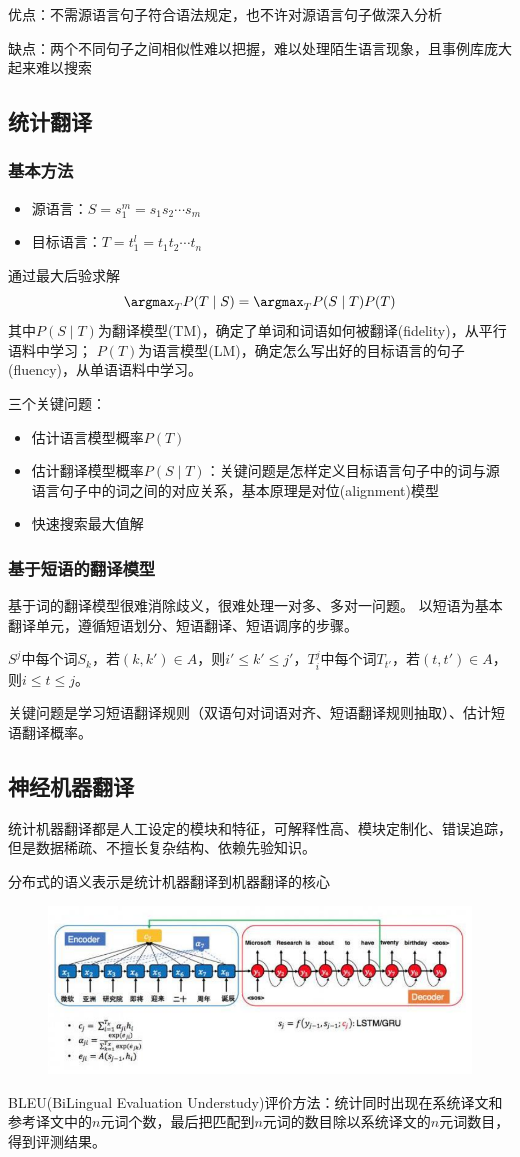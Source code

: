 优点：不需源语言句子符合语法规定，也不许对源语言句子做深入分析
\par 缺点：两个不同句子之间相似性难以把握，难以处理陌生语言现象，且事例库庞大起来难以搜索

\subsection{统计翻译}
\subsubsection{基本方法}
\begin{itemize}
	\item 源语言：$S=s_1^m=s_1s_2\cdots s_m$
	\item 目标语言：$T=t_1^l=t_1t_2\cdots t_n$
\end{itemize}
通过最大后验求解
\[\argmax_TP(T\mid S)=\argmax_T P(S\mid T)P(T)\]
其中$P(S\mid T)$为翻译模型(TM)，确定了单词和词语如何被翻译(fidelity)，从平行语料中学习；
$P(T)$为语言模型(LM)，确定怎么写出好的目标语言的句子(fluency)，从单语语料中学习。

三个关键问题：
\begin{itemize}
	\item 估计语言模型概率$P(T)$
	\item 估计翻译模型概率$P(S\mid T)$：关键问题是怎样定义目标语言句子中的词与源语言句子中的词之间的对应关系，基本原理是对位(alignment)模型
	\item 快速搜索最大值解
\end{itemize}

\subsubsection{基于短语的翻译模型}
基于词的翻译模型很难消除歧义，很难处理一对多、多对一问题。
以短语为基本翻译单元，遵循短语划分、短语翻译、短语调序的步骤。
\begin{definition}[对齐一致性]
$S^j$中每个词$S_k$，若$(k,k')\in A$，则$i'\leq k'\leq j'$，$T_i^j$中每个词$T_{t'}$，若$(t,t')\in A$，则$i\leq t\leq j$。
\end{definition}

关键问题是学习短语翻译规则（双语句对词语对齐、短语翻译规则抽取）、估计短语翻译概率。

\subsection{神经机器翻译}
统计机器翻译都是人工设定的模块和特征，可解释性高、模块定制化、错误追踪，但是数据稀疏、不擅长复杂结构、依赖先验知识。

分布式的语义表示是统计机器翻译到机器翻译的核心
\begin{figure}[H]
\centering
\includegraphics[width=0.6\linewidth]{fig/attention.png}
\end{figure}

BLEU(BiLingual Evaluation Understudy)评价方法：统计同时出现在系统译文和参考译文中的$n$元词个数，最后把匹配到$n$元词的数目除以系统译文的$n$元词数目，得到评测结果。